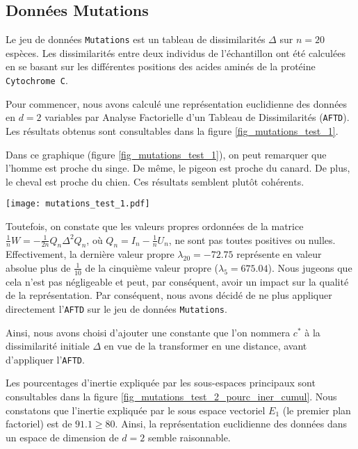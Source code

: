 \documentclass{article}
\begin{document}
\begin{multicols}{2}
\subsection{Données Mutations}
\label{subsec_visualisation_donnes_mutations}
Le jeu de données \texttt{Mutations} est un tableau de dissimilarités $\Delta$ sur $n = 20$ espèces. Les dissimilarités entre deux individus de l'échantillon ont été calculées en se basant sur les différentes positions des acides aminés de la protéine \texttt{Cytochrome C}.

Pour commencer, nous avons calculé une représentation euclidienne des données en $d = 2$ variables par Analyse Factorielle d'un Tableau de Dissimilarités (\texttt{AFTD}). Les résultats obtenus sont consultables dans la figure \ref{fig_mutations_test_1}. 

Dans ce graphique (figure \ref{fig_mutations_test_1}), on peut remarquer que l'homme est proche du singe. De même, le pigeon est proche du canard. De plus, le cheval est proche du chien. Ces résultats semblent plutôt cohérents.

\begingroup
   \centering
   \texttt{[image: mutations\_test\_1.pdf]}
    \label{fig_mutations_test_1}
\endgroup

Toutefois, on constate que les valeurs propres ordonnées de la matrice $\frac{1}{n}W = -\frac{1}{2n}Q_n \Delta^2 Q_n$, où $Q_n = I_n - \frac{1}{n} U_n$, ne sont pas toutes positives ou nulles. Effectivement, la dernière valeur propre $\lambda_{20} = -72.75$ représente en valeur absolue plus de $\frac{1}{10}$ de la cinquième valeur propre ($\lambda_{5} = 675.04$). Nous jugeons que cela n'est pas négligeable et peut, par conséquent, avoir un impact sur la qualité de la représentation. Par conséquent, nous avons décidé de ne plus appliquer directement l'\texttt{AFTD} sur le jeu de données \texttt{Mutations}.  

Ainsi, nous avons choisi d'ajouter une constante que l'on nommera $c^\ast$ à la dissimilarité initiale $\Delta$ en vue de la transformer en une distance, avant d'appliquer l'\texttt{AFTD}. 

Les pourcentages d'inertie expliquée par les sous-espaces principaux sont consultables dans la figure \ref{fig_mutations_test_2_pourc_iner_cumul}. Nous constatons que l'inertie expliquée par le sous espace vectoriel $E_1$ (le premier plan factoriel) est de $91.1 \geq 80$. Ainsi, la représentation euclidienne des données dans un espace de dimension de $d = 2$ semble raisonnable. 


\end{multicols}
\end{document}

